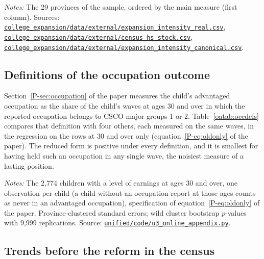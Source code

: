 \documentclass[11pt]{article}
\numberwithin{equation}{section}
\newcommand{\repourl}{https://github.com/JiachenJin1001/before-the-labor-market-or-inside-it}
\newcommand{\code}[1]{\href{\repourl/blob/main/#1}{\nolinkurl{#1}}}
\begin{document}
\begin{table}[H]
\centering
\footnotesize
\caption{Provincial intensity measures.}
\label{oatab:intensity}
\setlength{\tabcolsep}{3.4pt}

\par\smallskip
\begin{minipage}{0.96\textwidth}
\footnotesize\emph{Notes:} The 29 provinces of the sample,
ordered by the main measure (first column). Sources:
\code{college_expansion/data/external/expansion_intensity_real.csv},
\code{college_expansion/data/external/census_hs_stock.csv},
\code{college_expansion/data/external/expansion_intensity_canonical.csv}.
\end{minipage}
\end{table}

\subsection{Definitions of the occupation outcome}

Section~\ref{P-sec:occupation} of the paper measures the child's
advantaged occupation as the share of the child's waves at ages 30
and over in which the reported occupation belongs to CSCO major groups 1 or 2.
Table~\ref{oatab:occdefs} compares that definition with four others,
each measured on the same waves, in the regression on the rows at 30
and over only (equation~\eqref{P-eq:oldonly} of the paper). The reduced
form is positive under every definition, and it is smallest for having held such an
occupation in any single wave, the noisiest measure of a lasting
position.

\begin{table}[H]
\centering
\small
\caption{The occupation reduced form under five definitions of the
outcome.}
\label{oatab:occdefs}

\par\smallskip
\begin{minipage}{0.92\textwidth}
\footnotesize\emph{Notes:} The 2,774 children with a level of earnings at ages 30 and over, one observation per child (a child without an occupation report at those ages counts as never in an advantaged occupation),
specification of equation~\eqref{P-eq:oldonly} of the paper. Province-clustered standard errors;
wild cluster bootstrap $p$-values with 9,999 replications. Source:
\code{unified/code/u3_online_appendix.py}.
\end{minipage}
\end{table}

\subsection{Trends before the reform in the census}
\end{document}
